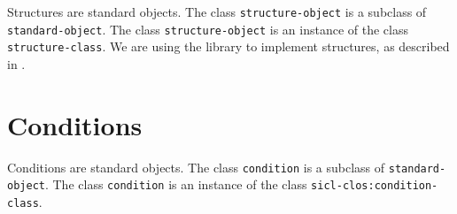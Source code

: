 Structures are standard objects.  The class \texttt{structure-object}
is a subclass of \texttt{standard-object}.  The class
\texttt{structure-object} is an instance of the class
\texttt{structure-class}.  We are using the library \anatomicl{} to
implement structures, as described in .

\section{Conditions}

Conditions are standard objects.  The class \texttt{condition} is a
subclass of \texttt{standard-object}.  The class \texttt{condition} is
an instance of the class \texttt{sicl-clos:condition-class}.

